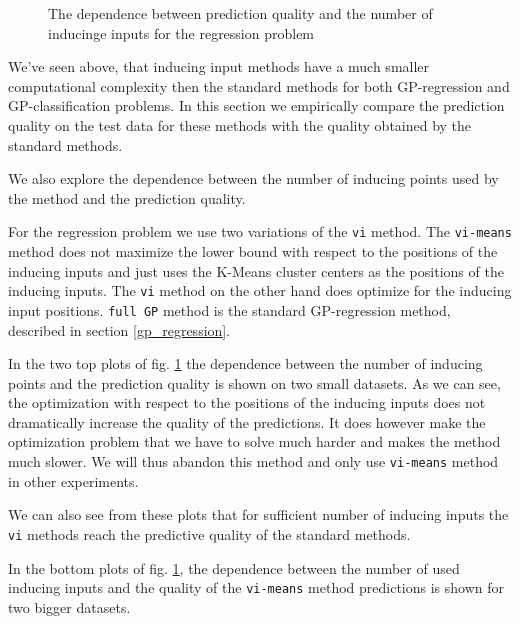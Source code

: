 \begin{figure}[!t]
	\centering
	\subfloat{
		\scalebox{0.8}{
			
		}
	}
	\subfloat{
		\scalebox{0.8}{
			
		}
	}

	\subfloat{
		\scalebox{0.8}{
			
		}
	}
	\subfloat{
		\scalebox{0.8}{
			
		}
	}
	\caption{The dependence between prediction quality and the number of inducinge inputs for the regression problem}
	\label{ind_points_results}
\end{figure}


We've seen above, that inducing input methods have a much smaller computational complexity then the standard methods for both GP-regression and GP-classification problems. In this section we empirically compare the prediction quality on the test data for these methods with the quality obtained by the standard methods.

We also explore the dependence between the number of inducing points used by the method and the prediction quality.

For the regression problem we use two variations of the \lstinline{vi} method. The \lstinline{vi-means} method does not maximize the lower bound with respect to the positions of the inducing inputs and just uses the K-Means cluster centers as the positions of the inducing inputs. The \lstinline{vi} method on the other hand does optimize for the inducing input positions. \lstinline{full GP} method is the standard GP-regression method, described in section \ref{gp_regression}.

In the two top plots of fig. \ref{ind_points_results} the dependence between the number of inducing points and the prediction quality is shown on two small datasets.  As we can see, the optimization with respect to the positions of the inducing inputs does not dramatically increase the quality of the predictions. It does however make the optimization problem that we have to solve much harder and makes the method much slower. We will thus abandon this method and only use \lstinline{vi-means} method in other experiments.

We can also see from these plots that for sufficient number of inducing inputs the \lstinline{vi} methods reach the predictive quality of the standard methods. 

In the bottom plots of fig. \ref{ind_points_results}, the dependence between the number of used inducing inputs and the quality of the \lstinline{vi-means} method predictions is shown for two bigger datasets. 

